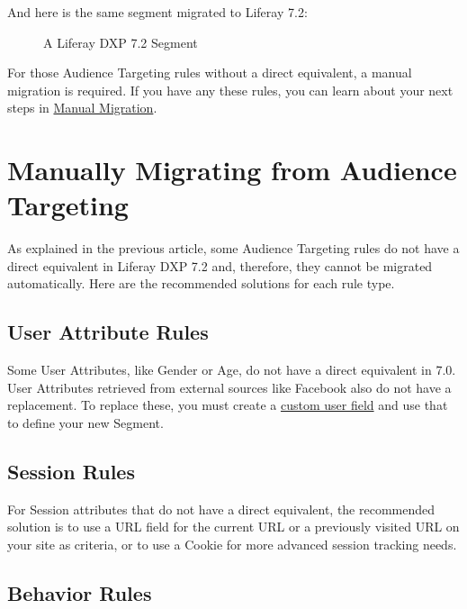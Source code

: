 And here is the same segment migrated to Liferay 7.2:

\begin{figure}
\centering
{}
\caption{A Liferay DXP 7.2 Segment}
\end{figure}

For those Audience Targeting rules without a direct equivalent, a manual
migration is required. If you have any these rules, you can learn about
your next steps in
\href{/docs/7-2/deploy/-/knowledge_base/d/manually-migrating-from-audience-targeting}{Manual
Migration}.

\chapter{Manually Migrating from Audience
Targeting}\label{manually-migrating-from-audience-targeting}

As explained in the previous article, some Audience Targeting rules do
not have a direct equivalent in Liferay DXP 7.2 and, therefore, they
cannot be migrated automatically. Here are the recommended solutions for
each rule type.

\section{User Attribute Rules}\label{user-attribute-rules}

Some User Attributes, like Gender or Age, do not have a direct
equivalent in 7.0. User Attributes retrieved from external sources like
Facebook also do not have a replacement. To replace these, you must
create a
\href{/docs/7-2/user/-/knowledge_base/u/creating-segments-with-custom-fields-and-session-data}{custom
user field} and use that to define your new Segment.

\section{Session Rules}\label{session-rules}

For Session attributes that do not have a direct equivalent, the
recommended solution is to use a URL field for the current URL or a
previously visited URL on your site as criteria, or to use a Cookie for
more advanced session tracking needs.

\section{Behavior Rules}\label{behavior-rules}

